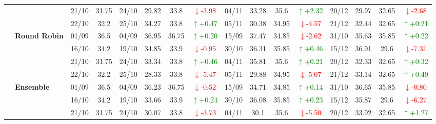 {\begin{longtable}{llcc|cccc|cccc|cccc}
&
& 21/10 & 31.75 & 24/10 & 29.82 & 33.8 & \textcolor{red}{\(\downarrow\)-3.98} & 04/11 & 33.28 & 35.6 & \textcolor{green}{\(\uparrow\)+2.32} & 20/12 & 29.97 & 32.65 & \textcolor{red}{\(\downarrow\)-2.68} \\

&
& 22/10 & 32.2 & 25/10 & 34.27 & 33.8 & \textcolor{green}{\(\uparrow\)+0.47} & 05/11 & 30.38 & 34.95 & \textcolor{red}{\(\downarrow\)-4.57} & 21/12 & 32.44 & 32.65 & \textcolor{green}{\(\uparrow\)+0.21} \\
\cmidrule(lr){2-16}


& \textbf{Round Robin}
& 01/09 & 36.5 & 04/09 & 36.95 & 36.75 & \textcolor{green}{\(\uparrow\)+0.20} & 15/09 & 37.47 & 34.85 & \textcolor{red}{\(\downarrow\)-2.62} & 31/10 & 35.63 & 35.85 & \textcolor{green}{\(\uparrow\)+0.22} \\

&
& 16/10 & 34.2 & 19/10 & 34.85 & 33.9 & \textcolor{red}{\(\downarrow\)-0.95} & 30/10 & 36.31 & 35.85 & \textcolor{green}{\(\uparrow\)+0.46} & 15/12 & 36.91 & 29.6 & \textcolor{red}{\(\downarrow\)-7.31} \\

&
& 21/10 & 31.75 & 24/10 & 33.34 & 33.8 & \textcolor{green}{\(\uparrow\)+0.46} & 04/11 & 35.81 & 35.6 & \textcolor{green}{\(\uparrow\)+0.21} & 20/12 & 32.33 & 32.65 & \textcolor{green}{\(\uparrow\)+0.32} \\

&
& 22/10 & 32.2 & 25/10 & 28.33 & 33.8 & \textcolor{red}{\(\downarrow\)-5.47} & 05/11 & 29.88 & 34.95 & \textcolor{red}{\(\downarrow\)-5.07} & 21/12 & 33.14 & 32.65 & \textcolor{green}{\(\uparrow\)+0.49} \\
\cmidrule(lr){2-16}



& \textbf{Ensemble}
& 01/09 & 36.5 & 04/09 & 36.23 & 36.75 & \textcolor{red}{\(\downarrow\)-0.52} & 15/09 & 34.71 & 34.85 & \textcolor{green}{\(\uparrow\)+0.14} & 31/10 & 36.65 & 35.85 & \textcolor{red}{\(\downarrow\)-0.80} \\

&
& 16/10 & 34.2 & 19/10 & 33.66 & 33.9 & \textcolor{green}{\(\uparrow\)+0.24} & 30/10 & 36.08 & 35.85 & \textcolor{green}{\(\uparrow\)+0.23} & 15/12 & 35.87 & 29.6 & \textcolor{red}{\(\downarrow\)-6.27} \\

&
& 21/10 & 31.75 & 24/10 & 30.07 & 33.8 & \textcolor{red}{\(\downarrow\)-3.73} & 04/11 & 30.1 & 35.6 & \textcolor{red}{\(\downarrow\)-5.50} & 20/12 & 33.92 & 32.65 & \textcolor{green}{\(\uparrow\)+1.27} \\


\end{longtable}}
